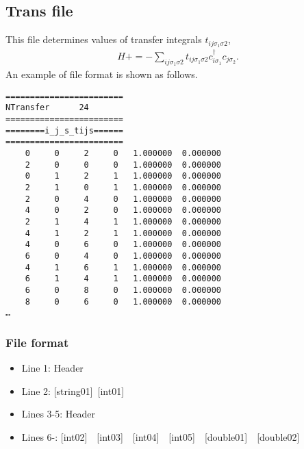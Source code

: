 \newpage
\subsection{Trans file}
\label{Subsec:Trans}
This file determines values of transfer integrals $t_{ij\sigma_1\sigma2}$,
\begin{align}
H +=-\sum_{ij\sigma_1\sigma2} t_{ij\sigma_1\sigma2}c_{i\sigma_1}^{\dag}c_{j\sigma_2}.
\end{align}
An example of file format is shown as follows.\\
\begin{minipage}{12.5cm}
\begin{screen}
\begin{verbatim}
======================== 
NTransfer      24  
======================== 
========i_j_s_tijs====== 
======================== 
    0     0     2     0   1.000000  0.000000
    2     0     0     0   1.000000  0.000000
    0     1     2     1   1.000000  0.000000
    2     1     0     1   1.000000  0.000000
    2     0     4     0   1.000000  0.000000
    4     0     2     0   1.000000  0.000000
    2     1     4     1   1.000000  0.000000
    4     1     2     1   1.000000  0.000000
    4     0     6     0   1.000000  0.000000
    6     0     4     0   1.000000  0.000000
    4     1     6     1   1.000000  0.000000
    6     1     4     1   1.000000  0.000000
    6     0     8     0   1.000000  0.000000
    8     0     6     0   1.000000  0.000000
…
\end{verbatim}
\end{screen}
\end{minipage}

\subsubsection{File format}
\begin{itemize}
   \item  Line 1:  Header
   \item  Line 2:   [string01]~[int01]
   \item  Lines 3-5:  Header
   \item  Lines 6-: [int02]~~[int03]~~[int04]~~[int05]~~[double01]~~[double02] 
  \end{itemize}
